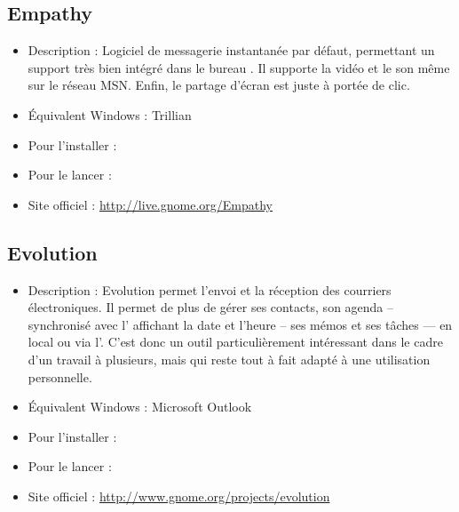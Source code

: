 \subsection{Empathy}
\label{RefEmpathy}
\begin{itemize}
\begingroup
{}
\item Description : Logiciel de messagerie instantanée par défaut, permettant un support  très bien intégré dans le bureau . Il supporte la vidéo et le son même sur le réseau MSN. Enfin, le partage d'écran est juste à portée de clic.{\par}
\item Équivalent Windows : Trillian{\par}
\item Pour l'installer : 
\item Pour le lancer : 
\item Site officiel : \url{http://live.gnome.org/Empathy}{\par}
\endgroup
\end{itemize}

\subsection{Evolution}
\begin{itemize}
\begingroup
{}
\item Description : Evolution permet l'envoi et la réception des courriers électroniques. Il permet de plus de gérer ses contacts, son agenda -- synchronisé avec l' affichant la date et l'heure -- ses mémos et ses tâches --- en local ou via l'. C'est donc un outil particulièrement intéressant dans le cadre d'un travail à plusieurs, mais qui reste tout à fait adapté à une utilisation personnelle.{\par}
\item Équivalent Windows : Microsoft Outlook{\par}
\item Pour l'installer : 
\item Pour le lancer : 
\item Site officiel : \url{http://www.gnome.org/projects/evolution}{\par}
\endgroup
\end{itemize}
\newpage
